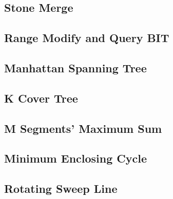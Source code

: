 \documentclass[a4paper,10pt,twocolumn,oneside]{article}
\begin{document}
\subsection{Stone Merge}


\subsection{Range Modify and Query BIT}


\subsection{Manhattan Spanning Tree}


\subsection{K Cover Tree}


\subsection{M Segments' Maximum Sum}


%

%

\subsection{Minimum Enclosing Cycle}


\subsection{Rotating Sweep Line}


%
\end{document}
